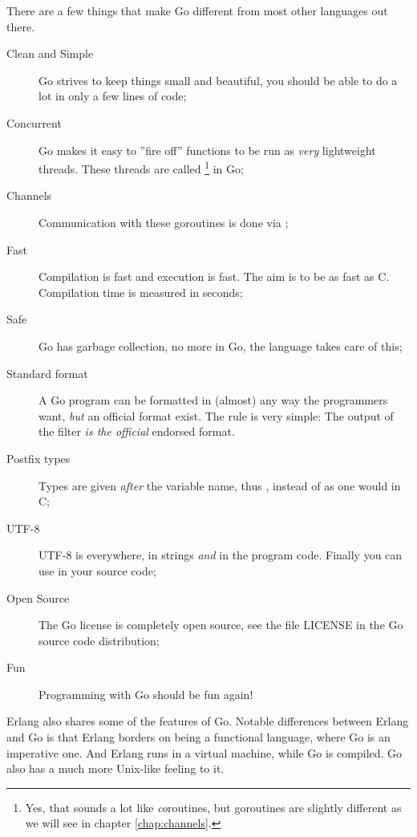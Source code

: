 \noindent{}There are a few things that make Go different from most other
languages out there.
\begin{description}
\item[Clean and Simple]
Go strives to keep things small and beautiful, you should
be able to do a lot in only a few lines of code;
\item[Concurrent]
Go makes it easy to ''fire off'' functions to be
run as \emph{very} lightweight threads. These threads are called
 \footnote{Yes, that sounds a lot like
\emph{co}routines, but goroutines are slightly different as we will
see in chapter \ref{chap:channels}.} in Go;

\item[Channels] 
Communication with these goroutines is done
via  \cite{csp}\cite{hoare};

\item[Fast]
Compilation is fast and execution is fast. The aim is
to be as fast as C. Compilation time is measured in seconds;

\item[Safe]
Go has garbage collection, no more  in Go,
the language takes care of this;

\item[Standard format]
A Go program can be formatted in (almost) any way the programmers want,
\emph{but} an official format exist. The rule is very simple:
The output of the filter  \emph{is the official} endorsed
format.

\item[Postfix types]
Types are given \emph{after} the variable name, thus ,
instead of  as one would in C;

\item[UTF-8]
UTF-8 is everywhere, in strings
\emph{and} in the program code. Finally you can use  in your source code;

\item[Open Source]
The Go license is completely open source, see the file LICENSE in the Go
source code distribution;

\item[Fun]
Programming with Go should be fun again!

\end{description}
Erlang \cite{erlang} also shares some
of the features of Go. Notable differences between Erlang
and Go is that Erlang borders on being a functional language,
where Go is an imperative one. And Erlang runs in a virtual
machine, while Go is compiled. Go also has a much more Unix-like
feeling to it.

